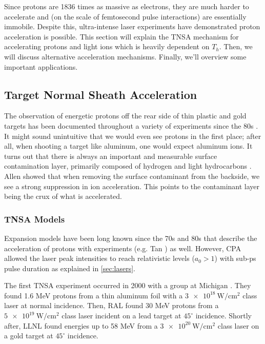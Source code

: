Since protons are 1836 times as massive as electrons, they are much harder to accelerate and (on the scale of femtosecond pulse interactions) are essentially immobile. Despite this, ultra-intense laser experiments have demonstrated proton acceleration is possible. This section will explain the \gls{TNSA} mechanism for accelerating protons and light ions which is heavily dependent on $T_h$. Then, we will discuss alternative acceleration mechanisms. Finally, we'll overview some important applications.

\subsection{Target Normal Sheath Acceleration}
The observation of energetic protons off the rear side of thin plastic and gold targets has been documented throughout a variety of experiments since the 80s \cite{Tan_1984_PoF}. It might sound unintuitive that we would even see protons in the first place; after all, when shooting a target like aluminum, one would expect aluminum ions. It turns out that there is always an important and measurable surface contamination layer, primarily composed of hydrogen and light hydrocarbons \cite{Gitomer_1986_PoF}. Allen \cite{Allen_2004_PRL} showed that when removing the surface contaminant from the backside, we see a strong suppression in ion acceleration. This points to the contaminant layer being the crux of what is accelerated.

\subsubsection{TNSA Models}

Expansion models have been long known since the 70s and 80s \cite{Crow_1975_JPP,Kishimoto_1983_PoF} that describe the acceleration of protons with experiments (e.g. Tan \cite{Tan_1984_PoF}) as well. However, \gls{CPA} \cite{Strickland_1985_Optics} allowed the laser peak intensities to reach relativistic levels ($a_0 > 1$) with sub-ps pulse duration as explained in \autoref{sec:lasers}.

The first \gls{TNSA} experiment occurred in 2000 with a group at Michigan \cite{Maksimchuk_2000_PRL}. They found 1.6 MeV protons from a thin aluminum foil with a $\SI{3e18}{\watt \per \centi \meter \squared}$ class laser at normal incidence. Then, \gls{RAL} found 30 MeV protons \cite{Clark_2000_PRL} from a $\SI{5e19}{\watt \per \centi \meter \squared}$ class laser incident on a lead target at $45^\circ$ incidence. Shortly after, \gls{LLNL} found energies up to 58 MeV \cite{Snavely_2000_PRL} from a $\SI{3e20}{\watt \per \centi \meter \squared}$ class laser on a gold target at $45^\circ$ incidence.

